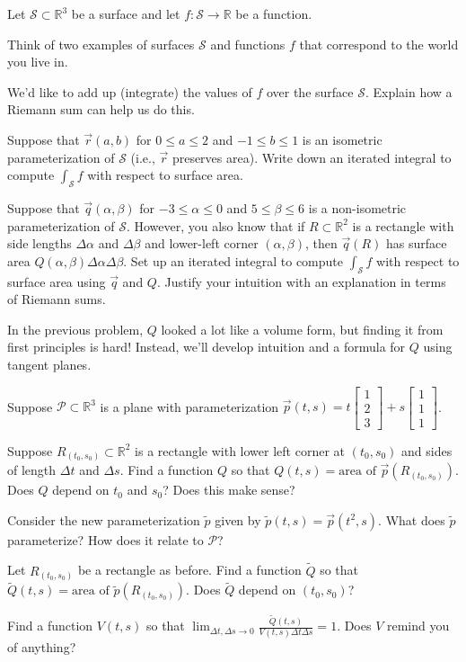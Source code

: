 \documentclass{problemset}
\newcommand{\R}{\mathbb{R}}
\newcommand{\mat}[1]{\begin{bmatrix}#1\end{bmatrix}}
\begin{document}
	\question
	Let $\mathcal S\subset \R^3$ be a surface and let $f:\mathcal S\to \R$ be a function.
	\begin{parts}
		\item Think of two examples of surfaces $\mathcal S$ and functions $f$ that correspond
			to the world you live in.
		\item We'd like to add up (integrate) the values of $f$ over the surface $\mathcal S$.  Explain
			how a Riemann sum can help us do this.
		\item Suppose that $\vec r(a,b)$ for $0\leq a\leq 2$ and $-1\leq b\leq 1$ is an isometric
			parameterization of $\mathcal S$ (i.e., $\vec r$ preserves area).  Write down
			an iterated integral to compute $\displaystyle \int_{\mathcal S} f$ with respect
			to surface area.
		\item Suppose that $\vec q(\alpha,\beta)$ for $-3\leq \alpha\leq 0$ and $5\leq \beta\leq 6$
			is a non-isometric parameterization of $\mathcal S$.  However,
			you also know that if $R\subset \R^2$ is a rectangle with side lengths $\Delta\alpha$
			and $\Delta\beta$ and lower-left corner $(\alpha,\beta)$, then $\vec q(R)$ has surface area
			$Q(\alpha,\beta)\Delta \alpha\Delta\beta$.  Set up an iterated integral to compute
			$\displaystyle \int_{\mathcal S} f$ with respect
			to surface area using $\vec q$ and $Q$.  Justify your intuition with an explanation in
			terms of Riemann sums.
	\end{parts}

	In the previous problem, $Q$ looked a lot like a volume form, but finding it from first principles
	is hard!  Instead, we'll develop intuition and a formula for $Q$ using tangent planes.

	\question
	Suppose $\mathcal P\subset \R^3$ is a plane with parameterization $\vec p(t,s) = t\mat{1\\2\\3} + s\mat{1\\1\\1}$.
	\begin{parts}
		\item Suppose $R_{(t_0,s_0)}\subset \R^2$ is a rectangle with lower left corner at $(t_0,s_0)$ and 
			sides of length $\Delta t$ and $\Delta s$.  Find a function $Q$ so that $Q(t,s) =\text{area of }\vec p(R_{(t_0,s_0)})$.
			Does $Q$ depend on $t_0$ and $s_0$?  Does this make sense?
		\item Consider the new parameterization $\tilde p$ given by $\tilde p(t,s) = \vec p(t^2,s)$.  What does
			$\tilde p$ parameterize?  How does it relate to $\mathcal P$?
		\item Let $R_{(t_0,s_0)}$ be a rectangle as before.  Find a function $\tilde Q$ so that
			$\tilde Q(t,s) =\text{area of }\tilde p(R_{(t_0,s_0)})$.  Does $\tilde Q$ depend on
			$(t_0,s_0)$?
		\item Find a function $V(t,s)$ so that $\displaystyle\lim_{\Delta t,\Delta s\to 0} \frac{\tilde Q(t,s)}{V(t,s)\Delta t\Delta s}
			=1$.  Does $V$ remind you of anything?
	\end{parts}
\end{document}
